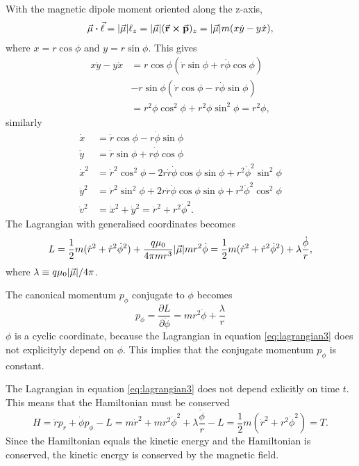 \documentclass[11pt]{amsart}
\begin{document}
With the magnetic dipole moment oriented along the z-axis, 
\begin{align*}
\va{\mu}\vdot\va{\ell} = \abs{\va{\mu}}\ell_z = \abs{\va{\mu}}(\va{r}\cp\va{p})_z = \abs{\va{\mu}}m(x\dot{y}-y\dot{x}),
\end{align*} 
where $x = r\cos\phi$ and $y = r\sin\phi$. This gives
\begin{align*}
x\dot{y} - y\dot{x} &= r\cos\phi(\dot{r}\sin\phi + r\dot{\phi}\cos\phi) \\
					&- r\sin\phi(\dot{r}\cos\phi - r\dot{\phi}\sin\phi) \\
					&= r^2\phi\cos^2\phi + r^2\phi\sin^2\phi = r^2\phi,
\end{align*} 
similarly
\begin{align*}
\dot{x} &= \dot{r}\cos\phi - r\dot{\phi}\sin\phi \\
\dot{y} &= \dot{r}\sin\phi + r\dot{\phi}\cos\phi \\
\dot{x}^2 &= \dot{r}^2\cos^2\phi - 2r\dot{r}\dot{\phi}\cos\phi\sin\phi + r^2\dot{\phi}^2\sin^2\phi \\
\dot{y}^2 &= \dot{r}^2\sin^2\phi + 2r\dot{r}\dot{\phi}\cos\phi\sin\phi + r^2\dot{\phi}^2\cos^2\phi \\
\dot{v}^2 &= \dot{x}^2 + \dot{y}^2 = \dot{r}^2 + r^2\dot{\phi}^2.
\end{align*}
The Lagrangian with generalised coordinates becomes
\begin{equation}
\label{eq:lagrangian3}
L = \frac{1}{2}m(\dot{r}^2 + \dot{r}^2\dot{\phi}^2) + \frac{q\mu_0}{4\pi mr^3}\abs{\va{\mu}}mr^2\dot{\phi} = \frac{1}{2}m(\dot{r}^2 + \dot{r}^2\dot{\phi}^2) + \lambda\frac{\dot{\phi}}{r},
\end{equation}
where $\lambda \equiv q\mu_0\abs{\va{\mu}}/4\pi$. 

The canonical momentum $p_\phi$ conjugate to $\phi$ becomes
\begin{equation}
\label{eq:conjmomphi}
p_\phi = \frac{\partial L}{\partial \dot{\phi}} = mr^2\dot{\phi} + \frac{\lambda}{r}
\end{equation}
$\phi$ is a cyclic coordinate, because the Lagrangian in equation \ref{eq:lagrangian3} does not explicityly depend on $\phi$. This implies that the conjugate momentum $p_\phi$ is constant. 

The Lagrangian in equation \ref{eq:lagrangian3} does not depend exlicitly on time $t$. This means that the Hamiltonian must be conserved
\begin{equation}
H = \dot{r}p_r + \dot{\phi}p_\phi - L = m\dot{r}^2 + mr^2\dot{\phi}^2 + \lambda\frac{\dot{\phi}}{r} - L = \frac{1}{2}m(\dot{r}^2 + r^2\dot{\phi}^2) = T.
\end{equation}
Since the Hamiltonian equals the kinetic energy and the Hamiltonian is conserved, the kinetic energy is conserved by the magnetic field.
\end{document}
